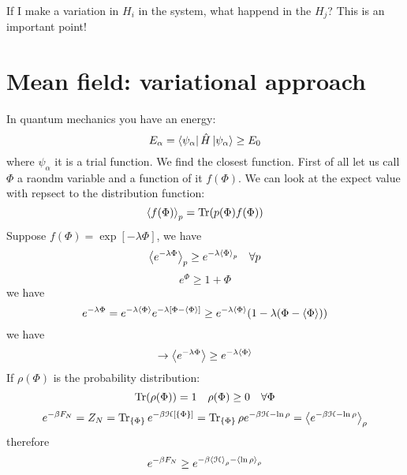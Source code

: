 \documentclass[../main/main.tex]{subfiles}
\begin{document}
If I make a variation in \( H_i \) in the system, what happend in the \( H_j \)? This is an important point!

\section{Mean field: variational approach}
In quantum mechanics you have an energy:
\begin{equation}
  E_{\alpha } = \bra{\psi _ \alpha } \hat{H} \ket{\psi _ \alpha } \ge E_0
\end{equation}
where \( \psi _ \alpha  \) it is a trial function. We find the closest function. First of all let us call \( \Phi  \)  a raondm variable and a function of it \( f(\Phi ) \). We can look at the expect value with repsect to the distribution function:
\begin{equation}
  \expval{f(\Phi )}_{p } = \Tr(p(\Phi )f(\Phi ))
\end{equation}
Suppose \( f(\Phi ) = \exp [-\lambda \Phi ]  \), we have
\begin{equation}
  \expval{e^{-\lambda \Phi } }_p \ge e^{- \lambda \expval{\Phi }_p } \quad \forall p
\end{equation}
\begin{equation}
 e^{\Phi } \ge 1+\Phi
\end{equation}
we have
\begin{equation}
  e^{-\lambda \Phi } = e^{- \lambda \expval{\Phi } } e^{- \lambda [\Phi - \expval{\Phi } ]}
  \ge e^{-\lambda \expval{\Phi }  } (1- \lambda (\Phi - \expval{\Phi} ))
\end{equation}
we have
\begin{equation}
 \rightarrow   \expval{e^{-\lambda \Phi }}  \ge e^{-\lambda \expval{\Phi } }
\end{equation}
If \( \rho (\Phi ) \) is the probability distribution:
\begin{equation}
  \Tr(\rho (\Phi )) = 1 \quad \rho (\Phi ) \ge 0 \quad \forall \Phi
   \label{eq:12_2}
\end{equation}
\begin{equation}
  e^{-\beta F_N} = Z_N = \Tr_{\{ \Phi  \}  } e^{-\beta \mathcal{H}[\{ \Phi \}  ]}
                = \Tr_{\{ \Phi  \}  } \rho e^{-\beta \mathcal{H}-\ln{\rho } }
                = \expval{e^{-\beta \mathcal{H}- \ln{\rho } } }_\rho
\end{equation}
therefore
\begin{equation}
  e^{-\beta F_N} \ge e^{-\beta \expval{\mathcal{H}}_\rho - \expval{\ln{\rho } }_\rho  }
\end{equation}
\end{document}
